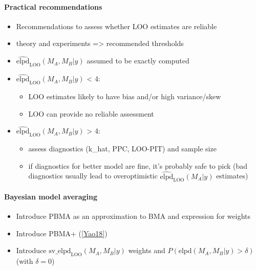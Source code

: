 \hypertarget{practical-recommendations}{%
\paragraph{Practical recommendations}\label{practical-recommendations}}

\begin{itemize}
\tightlist
\item
  Recommendations to assess whether LOO estimates are reliable
\item
  theory and experiments =\textgreater{} recommended thresholds
\item
  \(\widehat{\mathrm{elpd}}_\mathrm{LOO}(M_A, M_B | y)\) assumed to be
  exactly computed
\item
  \textbar{}\(\widehat{\mathrm{elpd}}_\mathrm{LOO}(M_A, M_B | y)\)\textbar{}
  \textless{} 4:

  \begin{itemize}
  \tightlist
  \item
    LOO estimates likely to have bias and/or high variance/skew
  \item
    LOO can provide no reliable assessment
  \end{itemize}
\item
  \textbar{}\(\widehat{\mathrm{elpd}}_\mathrm{LOO}(M_A, M_B | y)\)\textbar{}
  \textgreater{} 4:

  \begin{itemize}
  \tightlist
  \item
    assess diagnostics (k\_hat, PPC, LOO-PIT) and sample size
  \item
    if diagnostics for better model are fine, it's probably safe to pick
    (bad diagnostics usually lead to overoptimistic
    \(\widehat{\mathrm{elpd}}_\mathrm{LOO}(M_A | y)\) estimates)
  \end{itemize}
\end{itemize}

\hypertarget{bayesian-model-averaging}{%
\paragraph{Bayesian model averaging}\label{bayesian-model-averaging}}

\begin{itemize}
\tightlist
\item
  Introduce PBMA as an approximation to BMA and expression for weights
\item
  Introduce PBMA+
  (\href{http://dx.doi.org/10.1214/17-BA1091}{{[}Yao18{]}})
\item
  Introduce \(\mathrm{sv\_elpd}_\mathrm{LOO}(M_A, M_B | y)\) weights and
  \(P(\mathrm{elpd}(M_A, M_B | y) > \delta)\) (with \(\delta = 0\))
\end{itemize}

